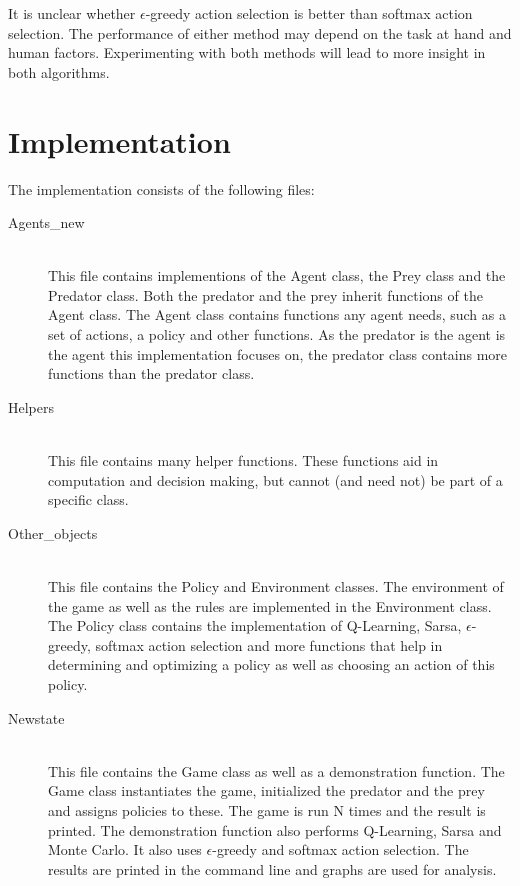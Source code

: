 \documentclass{article}
\begin{document}
It is unclear whether $\epsilon$-greedy action selection is better than softmax action selection. The performance of either method may depend on the task at hand and human factors. Experimenting with both methods will lead to more insight in both algorithms.
\pagebreak

\section{Implementation}
The implementation consists of the following files:
\begin{description}
	\item[Agents\_new] \hfill \\ 
	This file contains implementions of the Agent class, the Prey class and the Predator class. Both the predator and the prey inherit functions of the Agent class. The Agent class contains functions any agent needs, such as a set of actions, a policy and other functions. As the predator is the agent is the agent this implementation focuses on, the predator class contains more functions than the predator class.
	
	\item[Helpers] \hfill \\ 
	This file contains many helper functions. These functions aid in computation and decision making, but cannot (and need not) be part of a specific class.
	
	\item[Other\_objects] \hfill \\ %
	This file contains the Policy and Environment classes. The environment of the game as well as the rules are implemented in the Environment class. The Policy class contains the implementation of Q-Learning, Sarsa, $\epsilon$-greedy, softmax action selection and more functions that help in determining and optimizing a policy as well as choosing an action of this policy.
	\item[Newstate] \hfill \\ 
	This file contains the Game class as well as a demonstration function. The Game class instantiates the game, initialized the predator and the prey and assigns policies to these. The game is run N times and the result is printed. The demonstration function also performs Q-Learning, Sarsa and Monte Carlo. It also uses $\epsilon$-greedy and softmax action selection. The results are printed in the command line and graphs are used for analysis.
\end{description}
\pagebreak
\end{document}
